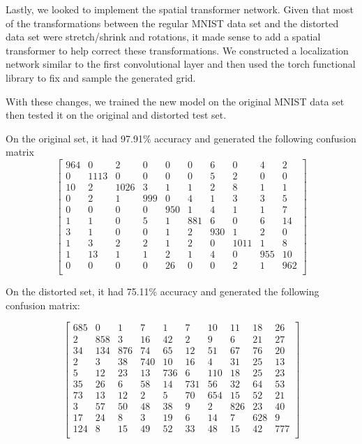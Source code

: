 \documentclass{article}
\begin{document}
Lastly, we looked to implement the spatial transformer network. Given that most of the transformations between the regular MNIST data set and the distorted data set were stretch/shrink and rotations, it made sense to add a spatial transformer to help correct these transformations. We constructed a localization network similar to the first convolutional layer and then used the torch functional library to fix and sample the generated grid.

With these changes, we trained the new model on the original MNIST data set then tested it on the original and distorted test set.

On the original set, it had 97.91\% accuracy and generated the following confusion matrix
$$
\begin{bmatrix}
 964&    0&    2&    0&    0&    0&    6&    0&    4&    2\\
   0& 1113&    0&    0&    0&    0&    5&    2&    0&    0\\
  10&    2& 1026&    3&    1&    1&    2&    8&    1&    1\\
   0&    2&    1&  999&    0&    4&    1&    3&    3&    5\\
   0&    0&    0&    0&  950&    1&    4&    1&    1&    7\\
   1&    1&    0&    5&    1&  881&    6&    0&    6&   14\\
   3&    1&    0&    0&    1&    2&  930&    1&    2&    0\\
   1&    3&    2&    2&    1&    2&    0& 1011&    1&    8\\
   1&   13&    1&    1&    2&    1&    4&    0&  955&   10\\
   0&    0&    0&    0&   26&    0&    0&    2&    1&  962\\
\end{bmatrix}
$$


On the distorted set, it had 75.11\% accuracy and generated the following confusion matrix:

$$
\begin{bmatrix}
685&   0&   1&   7&   1&   7&  10&  11&  18&  26\\
  2& 858&   3&  16&  42&   2&   9&   6&  21&  27\\
 34& 134& 876&  74&  65&  12&  51&  67&  76&  20\\
  2&   3&  38& 740&  10&  16&   4&  31&  25&  13\\
  5&  12&  23&  13& 736&   6& 110&  18&  25&  23\\
 35&  26&   6&  58&  14& 731&  56&  32&  64&  53\\
 73&  13&  12&   2&   5&  70& 654&  15&  52&  21\\
  3&  57&  50&  48&  38&   9&   2& 826&  23&  40\\
 17&  24&   8&   3&  19&   6&  14&   7& 628&   9\\
124&   8&  15&  49&  52&  33&  48&  15&  42& 777\\
 \end{bmatrix}
$$
\end{document}
